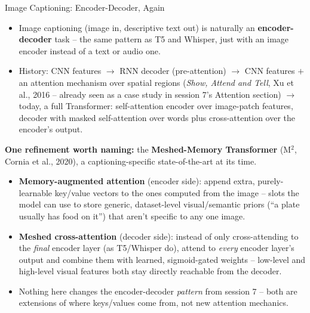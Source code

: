 \begin{vbframe}{Image Captioning: Encoder-Decoder, Again}
\begin{itemize}
  \item Image captioning (image in, descriptive text out) is naturally an \textbf{encoder-decoder} task -- the same pattern as T5 and Whisper, just with an image encoder instead of a text or audio one.
  \item History: CNN features $\to$ RNN decoder (pre-attention) $\to$ CNN features $+$ an attention mechanism over spatial regions (\emph{Show, Attend and Tell}, Xu et al., 2016 -- already seen as a case study in session 7's Attention section) $\to$ today, a full Transformer: self-attention encoder over image-patch features, decoder with masked self-attention over words plus cross-attention over the encoder's output.
\end{itemize}

\framebreak

\textbf{One refinement worth naming:} the \textbf{Meshed-Memory Transformer} (M$^2$, Cornia et al., 2020), a captioning-specific state-of-the-art at its time.
\begin{itemize}
  \item \textbf{Memory-augmented attention} (encoder side): append extra, purely-learnable key/value vectors to the ones computed from the image -- slots the model can use to store generic, dataset-level visual/semantic priors (``a plate usually has food on it'') that aren't specific to any one image.
  \item \textbf{Meshed cross-attention} (decoder side): instead of only cross-attending to the \emph{final} encoder layer (as T5/Whisper do), attend to \emph{every} encoder layer's output and combine them with learned, sigmoid-gated weights -- low-level and high-level visual features both stay directly reachable from the decoder.
  \item Nothing here changes the encoder-decoder \emph{pattern} from session 7 -- both are extensions of where keys/values come from, not new attention mechanics.
\end{itemize}
\end{vbframe}


